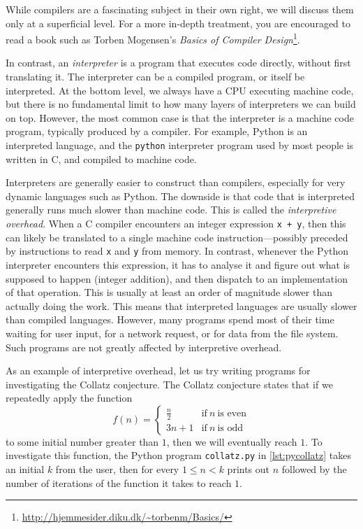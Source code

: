 While compilers are a fascinating subject in their own right, we will
discuss them only at a superficial level.  For a more in-depth
treatment, you are encouraged to read a book such as Torben Mogensen's
\textit{Basics of Compiler
  Design}\footnote{\url{http://hjemmesider.diku.dk/~torbenm/Basics/}}.

In contrast, an \textit{interpreter} is a program that executes code
directly, without first translating it.  The interpreter can be a
compiled program, or itself be interpreted.  At the bottom level, we
always have a CPU executing machine code, but there is no fundamental
limit to how many layers of interpreters we can build on top.
However, the most common case is that the interpreter is a machine
code program, typically produced by a compiler.  For example, Python
is an interpreted language, and the \texttt{python} interpreter
program used by most people is written in C, and compiled to machine
code.

Interpreters are generally easier to construct than compilers,
especially for very dynamic languages such as Python.  The downside is
that code that is interpreted generally runs much slower than machine
code.  This is called the \textit{interpretive overhead}.  When a C
compiler encounters an integer expression \texttt{x + y}, then this
can likely be translated to a single machine code
instruction---possibly preceded by instructions to read \texttt{x} and
\texttt{y} from memory.  In contrast, whenever the Python interpreter
encounters this expression, it has to analyse it and figure out what
is supposed to happen (integer addition), and then dispatch to an
implementation of that operation.  This is usually at least an order
of magnitude slower than actually doing the work.  This means that
interpreted languages are usually slower than compiled languages.
However, many programs spend most of their time waiting for user
input, for a network request, or for data from the file system.  Such
programs are not greatly affected by interpretive overhead.

As an example of interpretive overhead, let us try writing programs
for investigating the Collatz conjecture.  The Collatz conjecture
states that if we repeatedly apply the function
\[
  f(n) =
  \begin{cases}
    \frac{n}{2} & \text{if}~n~\text{is even} \\
    3n+1 & \text{if}~n~\text{is odd}
  \end{cases}
\]
to some initial number greater than $1$, then we will eventually reach
$1$.  To investigate this function, the Python program
\texttt{collatz.py} in \cref{lst:pycollatz} takes an initial $k$ from
the user, then for every $1\leq n<k$ prints out $n$ followed by the
number of iterations of the function it takes to reach $1$.

